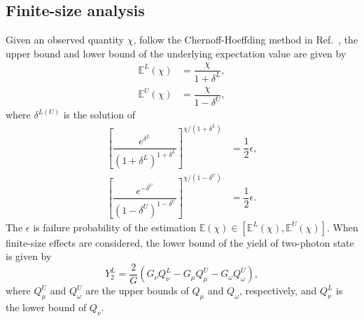 \documentclass[aps,twocolumn,superscriptaddress,showpacs,nofootinbib]{revtex4-2}
\begin{document}
\subsection{Finite-size analysis}\label{sec:Finite_size_analysis}
Given an observed quantity $\chi$, follow the Chernoff-Hoeffding method in Ref.~\cite{PRAZhang2017}, the upper bound and lower bound of the underlying expectation value are given by
\begin{equation}
\begin{split}
\mathbb{E}^L(\chi)&=\dfrac{\chi}{1+\delta^L},\\
\mathbb{E}^U(\chi)&=\dfrac{\chi}{1-\delta^U},
\end{split}
\end{equation}
where $\delta^{L(U)}$ is the solution of
\begin{equation}\label{eq:deltasolve}
\begin{split}
\left[\dfrac{e^{\delta^L}}{(1+\delta^L)^{1+\delta^L}}\right]^{\chi / (1+\delta^L)}&=\dfrac{1}{2}\epsilon,\\
\left[\dfrac{e^{-\delta^U}}{(1-\delta^U)^{1-\delta^U}}\right]^{\chi / (1-\delta^U)}&=\dfrac{1}{2}\epsilon.
\end{split}
\end{equation}
The $\epsilon$ is failure probability of the estimation $\mathbb{E}(\chi)\in [\mathbb{E}^L(\chi), \mathbb{E}^U(\chi)]$. When finite-size effects are considered, the lower bound of the yield of two-photon state is given by
\begin{equation}\label{eq:finit_key_y2}
Y_2^L = \frac{2}{G} \left( G_\nu Q_\nu^L - G_\mu Q_\mu^U - G_\omega Q_\omega^U \right),
\end{equation}
where $Q_\mu^U$ and $Q_\omega^U$ are the upper bounds of $Q_\mu$ and $Q_\omega$, respectively, and $Q_\nu^L$ is the lower bound of $Q_\nu$.
\end{document}
